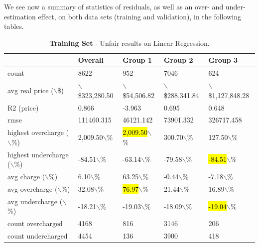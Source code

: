 \documentclass{article}
\begin{document}
We see now a summary of statistics of residuals, as well as an over- and under-estimation effect, on both data sets (training and validation), in the following tables.
\vspace{-0.5cm}
\begin{table}[!ht]
    \centering
    \begin{tabular}{|l|l|l|l|l|}
    \hline
        ~ & Overall & Group 1 & Group 2 & Group 3 \\ \hline
        count & 8622 & 952 & 7046 & 624 \\ \hline
        avg real price ($\backslash$\$) & $\backslash$\$323,280.50 & $\backslash$\$54,506.82 & $\backslash$\$288,341.84 & $\backslash$\$1,127,848.28 \\ \hline
        R2 (price) & 0.866 & -3.963 & 0.695 & 0.648 \\ \hline
        rmse & 111460.315 & 46121.142 & 73901.332 & 326717.458 \\ \hline
        highest overcharge ($\backslash$\%) & 2,009.50$\backslash$\% & \hl{2,009.50}$\backslash$\% & 300.70$\backslash$\% & 127.50$\backslash$\% \\ \hline
        highest undercharge ($\backslash$\%) & -84.51$\backslash$\% & -63.14$\backslash$\% & -79.58$\backslash$\% & \hl{-84.51}$\backslash$\% \\ \hline
        avg charge ($\backslash$\%) & 6.10$\backslash$\% & {63.25}$\backslash$\% & -0.44$\backslash$\% & -7.18$\backslash$\% \\ \hline
        avg overcharge ($\backslash$\%) & 32.08$\backslash$\% & \hl{76.97}$\backslash$\% & {21.44}$\backslash$\% & 16.89$\backslash$\% \\ \hline
        avg undercharge ($\backslash$\%) & -18.21$\backslash$\% & -19.03$\backslash$\% & -18.09$\backslash$\% & \hl{-19.04}$\backslash$\% \\ \hline
        count overcharged & 4168 & 816 & 3146 & 206 \\ \hline
        count undercharged & 4454 & 136 & 3900 & 418 \\ \hline
    \end{tabular}
    \caption{\textbf{Training Set} - Unfair results on Linear Regression. \vspace{-0.5cm}}
    \label{tab1:train_summary}
\end{table}
\end{document}
